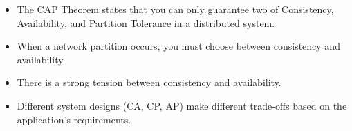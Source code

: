 \begin{itemize}[itemsep=1pt, topsep=1pt]
\item The CAP Theorem states that you can only guarantee two of Consistency, Availability, and Partition Tolerance in a distributed system.
\item When a network partition occurs, you must choose between consistency and availability.
\item There is a strong tension between consistency and availability.
\item Different system designs (CA, CP, AP) make different trade-offs based on the application's requirements.
\end{itemize}

